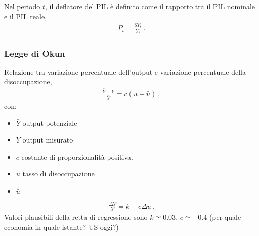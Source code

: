 \documentclass[letterpaper,10pt,italian]{jupyterBook}
\begin{document}
\sphinxAtStartPar
{} Nel periodo \(t\), il deflatore del PIL è definito come il rapporto tra il PIL nominale e il PIL reale,
\begin{equation*}
\begin{split}P_t = \frac{\$ Y_t}{Y_t} \ .\end{split}
\end{equation*}
\sphinxAtStartPar
{}


\subsubsection{Legge di Okun}
\label{\detokenize{ch/macro:legge-di-okun}}\label{\detokenize{ch/macro:economics-hs-macro-intro-macro-vars-okun}}
\sphinxAtStartPar
Relazione tra variazione percentuale dell’output e variazione percentuale della disoccupazione,
\begin{equation*}
\begin{split}\frac{\bar{Y} - Y}{\bar{Y}} = c ( u - \bar{u} ) \ ,\end{split}
\end{equation*}
\sphinxAtStartPar
con:
\begin{itemize}
\item {} 
\sphinxAtStartPar
\(\bar{Y}\) output potenziale

\item {} 
\sphinxAtStartPar
\(Y\) output misurato

\item {} 
\sphinxAtStartPar
\(c\) costante di proporzionalità positiva.

\item {} 
\sphinxAtStartPar
\(u\) tasso di disoccupazione

\item {} 
\sphinxAtStartPar
\(\bar{u}\) {\hyperref[\detokenize{ch/macro:economics-hs-macro-medium-run-unemployment-phillips}]{}}

\end{itemize}
\begin{equation*}
\begin{split}\frac{\Delta Y}{Y} = k - c \Delta u \ .\end{split}
\end{equation*}
\sphinxAtStartPar
Valori plausibili della retta di regressione sono \(k \simeq 0.03\), \(c \simeq -0.4\) (per quale economia in quale istante? US oggi?)
\end{document}
